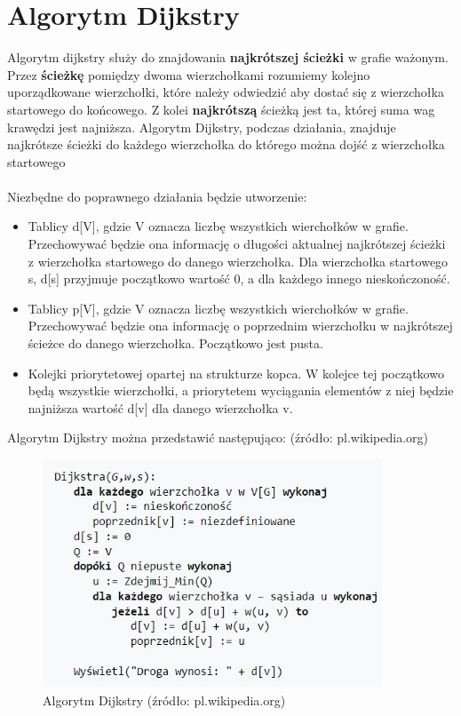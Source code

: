 \documentclass{article}
\begin{document}
\section{Algorytm Dijkstry}
Algorytm dijkstry służy do znajdowania  \textbf{najkrótszej ścieżki} w grafie ważonym. Przez \textbf{ścieżkę} pomiędzy dwoma wierzchołkami rozumiemy kolejno uporządkowane wierzchołki, które należy odwiedzić aby dostać się z wierzchołka startowego do końcowego. Z kolei \textbf{najkrótszą} ścieżką jest ta, której suma wag krawędzi jest najniższa. Algorytm Dijkstry, podczas działania, znajduje najkrótsze ścieżki do każdego wierzchołka do którego można dojść z wierzchołka startowego
\\ \\
Niezbędne do poprawnego działania będzie utworzenie:
\begin {itemize}

\item Tablicy d[V], gdzie V oznacza liczbę wszystkich wierchołków w grafie. Przechowywać będzie ona informację o długości aktualnej najkrótszej ścieżki z wierzchołka startowego do danego wierzchołka. Dla wierzchołka startowego s, d[s] przyjmuje początkowo wartość 0, a dla każdego innego nieskończoność.
\item Tablicy p[V], gdzie V oznacza liczbę wszystkich wierchołków w grafie. Przechowywać będzie ona informację o poprzednim wierzchołku w najkrótszej ścieżce do danego wierzchołka. Początkowo jest pusta.
\item Kolejki priorytetowej opartej na strukturze kopca. W kolejce tej początkowo będą wszystkie wierzchołki, a priorytetem wyciągania elementów z niej będzie najniższa wartość d[v] dla danego wierzchołka v.\\

\end{itemize}
Algorytm Dijkstry można przedstawić następująco: (źródło: pl.wikipedia.org)\\

\begin{figure}[t]
\centering
\includegraphics[width=0.9\textwidth]{alg_dijkstra.jpg}
\caption{\label{fig:dij}Algorytm Dijkstry (źródło: pl.wikipedia.org)}
\end{figure}
\end{document}
